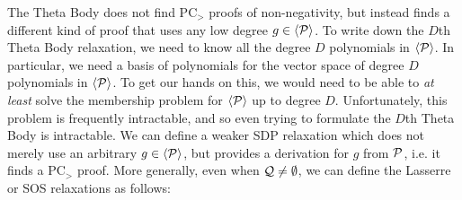 The Theta Body does not find PC$_>$ proofs of non-negativity, but instead finds a different kind of proof that uses any low degree $g \in \langle \mathcal P \rangle$. To write down the $D$th Theta Body relaxation, we need to know all the degree $D$ polynomials in $\langle \mathcal P \rangle$. In particular, we need a basis of polynomials for the vector space of degree $D$ polynomials in $\langle \mathcal P \rangle$. To get our hands on this, we would need to be able to \emph{at least} solve the membership problem for $\langle \mathcal P \rangle$ up to degree $D$. Unfortunately, this problem is frequently intractable, and so even trying to formulate the $D$th Theta Body is intractable. We can define a weaker SDP relaxation which does not merely use an arbitrary $g \in \langle \mathcal P \rangle$, but provides a derivation for $g$ from $\mathcal P$, i.e. it finds a PC$_>$ proof. More generally, even when $\mathcal Q \neq \emptyset$, we can define the Lasserre or SOS relaxations as follows:

